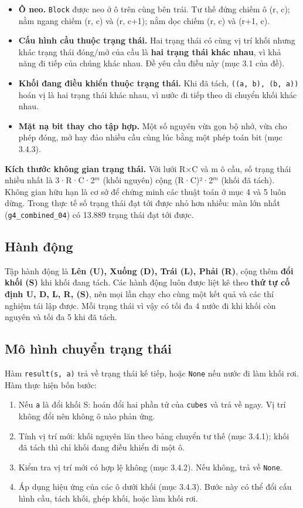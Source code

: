 \begin{itemize}
\item \textbf{Ô neo.} \texttt{Block} được neo ở ô trên cùng bên trái. Tư thế đứng chiếm ô (r, c); nằm ngang chiếm (r, c) và (r, c+1); nằm dọc chiếm (r, c) và (r+1, c).
\item \textbf{Cấu hình cầu thuộc trạng thái.} Hai trạng thái có cùng vị trí khối nhưng khác trạng thái đóng/mở của cầu là \textbf{hai trạng thái khác nhau}, vì khả năng đi tiếp của chúng khác nhau. Đề yêu cầu điều này (mục 3.1 của đề).
\item \textbf{Khối đang điều khiển thuộc trạng thái.} Khi đã tách, \texttt{((a, b), (b, a))} hoán vị là hai trạng thái khác nhau, vì nước đi tiếp theo di chuyển khối khác nhau.
\item \textbf{Mặt nạ bit thay cho tập hợp.} Một số nguyên vừa gọn bộ nhớ, vừa cho phép đóng, mở hay đảo nhiều cầu cùng lúc bằng một phép toán bit (mục 3.4.3).
\end{itemize}

\textbf{Kích thước không gian trạng thái.} Với lưới R×C và m ô cầu, số trạng thái nhiều nhất là 3·R·C·2$^{m}$ (khối nguyên) cộng (R·C)²·2$^{m}$ (khối đã tách). Không gian hữu hạn là cơ sở để chứng minh các thuật toán ở mục 4 và 5 luôn dừng. Trong thực tế số trạng thái đạt tới được nhỏ hơn nhiều: màn lớn nhất (\texttt{g4\_\allowbreak{}combined\_\allowbreak{}04}) có 13.889 trạng thái đạt tới được.

\subsection{Hành động}

Tập hành động là \textbf{Lên (U), Xuống (D), Trái (L), Phải (R)}, cộng thêm \textbf{đổi khối (S)} khi khối đang tách. Các hành động luôn được liệt kê theo \textbf{thứ tự cố định U, D, L, R, (S)}, nên mọi lần chạy cho cùng một kết quả và các thí nghiệm tái lập được. Mỗi trạng thái vì vậy có tối đa 4 nước đi khi khối còn nguyên và tối đa 5 khi đã tách.

\subsection{Mô hình chuyển trạng thái}

Hàm \texttt{result(s, a)} trả về trạng thái kế tiếp, hoặc \texttt{None} nếu nước đi làm khối rơi. Hàm thực hiện bốn bước:

\begin{enumerate}
\item Nếu \texttt{a} là đổi khối S: hoán đổi hai phần tử của \texttt{cubes} và trả về ngay. Vị trí không đổi nên không ô nào phản ứng.
\item Tính vị trí mới: khối nguyên lăn theo bảng chuyển tư thế (mục 3.4.1); khối đã tách thì chỉ khối đang điều khiển đi một ô.
\item Kiểm tra vị trí mới có hợp lệ không (mục 3.4.2). Nếu không, trả về \texttt{None}.
\item Áp dụng hiệu ứng của các ô dưới khối (mục 3.4.3). Bước này có thể đổi cấu hình cầu, tách khối, ghép khối, hoặc làm khối rơi.
\end{enumerate}

